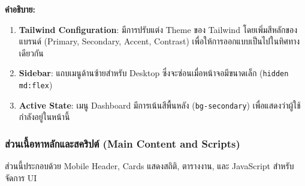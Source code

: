 \textbf{คำอธิบาย:}
\begin{enumerate}
    \item \textbf{Tailwind Configuration}: มีการปรับแต่ง Theme ของ Tailwind โดยเพิ่มสีหลักของแบรนด์ (Primary, Secondary, Accent, Contrast) เพื่อให้การออกแบบเป็นไปในทิศทางเดียวกัน
    \item \textbf{Sidebar}: แถบเมนูด้านซ้ายสำหรับ Desktop ซึ่งจะซ่อนเมื่อหน้าจอมีขนาดเล็ก (\texttt{hidden md:flex})
    \item \textbf{Active State}: เมนู Dashboard มีการเน้นสีพื้นหลัง (\texttt{bg-secondary}) เพื่อแสดงว่าผู้ใช้กำลังอยู่ในหน้านี้
\end{enumerate}

\subsubsection{ส่วนเนื้อหาหลักและสคริปต์ (Main Content and Scripts)}
ส่วนนี้ประกอบด้วย Mobile Header, Cards แสดงสถิติ, ตารางงาน, และ JavaScript สำหรับจัดการ UI

